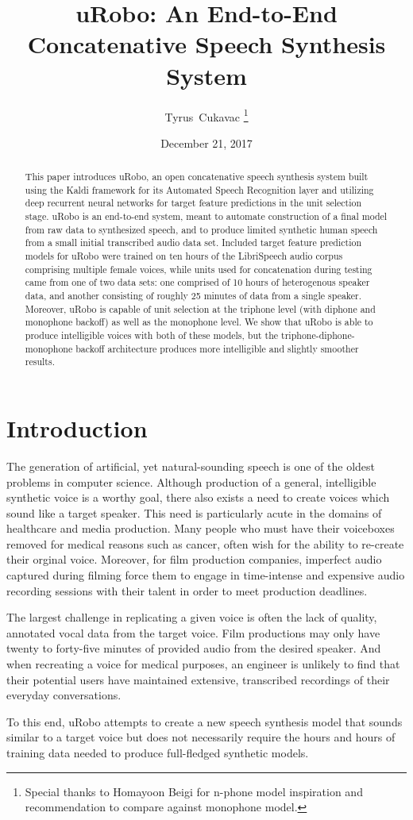 \documentclass[10pt, journal, compsoc]{IEEEtran}
\author{Tyrus~Cukavac%
\thanks{Special thanks to Homayoon Beigi for n-phone model inspiration and recommendation to compare against monophone model.}}
\title{uRobo: An End-to-End Concatenative Speech Synthesis System}
\date{December 21, 2017}
\begin{document}
\maketitle
\begin{abstract}
This paper introduces uRobo, an open concatenative speech synthesis system built using the Kaldi framework for its Automated Speech Recognition layer and utilizing deep recurrent neural networks for target feature predictions in the unit selection stage. uRobo is an end-to-end system, meant to automate construction of a final model from raw data to synthesized speech, and to produce limited synthetic human speech from a small initial transcribed audio data set. Included target feature prediction models for uRobo were trained on ten hours of the LibriSpeech audio corpus comprising multiple female voices, while units used for concatenation during testing came from one of two data sets: one comprised of 10 hours of heterogenous speaker data, and another consisting of roughly 25 minutes of data from a single speaker. Moreover, uRobo is capable of unit selection at the triphone level (with diphone and monophone backoff) as well as the monophone level. We show that uRobo is able to produce intelligible voices with both of these models, but the triphone-diphone-monophone backoff architecture produces more intelligible and slightly smoother results.
\end{abstract}
\section{Introduction}
The generation of artificial, yet natural-sounding speech is one of the oldest problems in computer science. Although production of a general, intelligible synthetic voice is a worthy goal, there also exists a need to create voices which sound like a target speaker. This need is particularly acute in the domains of healthcare and media production. Many people who must have their voiceboxes removed for medical reasons such as cancer, often wish for the ability to re-create their orginal voice. Moreover, for film production companies, imperfect audio captured during filming force them to engage in time-intense and expensive audio recording sessions with their talent in order to meet production deadlines.\par
The largest challenge in replicating a given voice is often the lack of quality, annotated vocal data from the target voice. Film productions may only have twenty to forty-five minutes of provided audio from the desired speaker. And when recreating a voice for medical purposes, an engineer is unlikely to find that their potential users have maintained extensive, transcribed recordings of their everyday conversations.\par
To this end, uRobo attempts to create a new speech synthesis model that sounds similar to a target voice but does not necessarily require the hours and hours of training data needed to produce full-fledged synthetic models.
\end{document}
